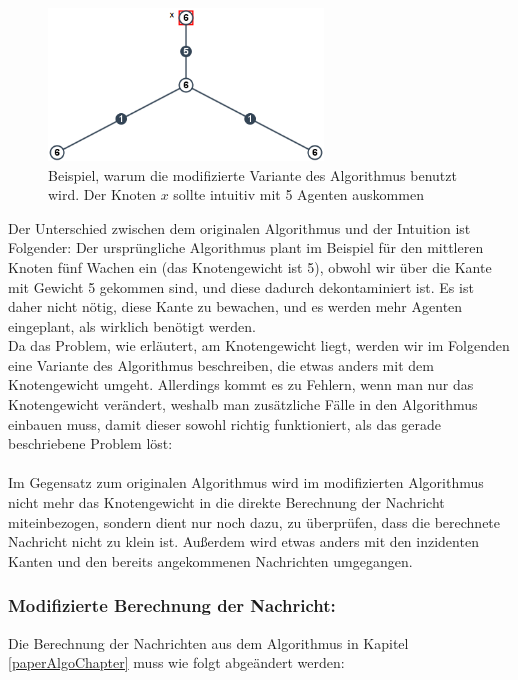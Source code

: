 		\begin{figure}[htb]
			\includegraphics[width=0.65\textwidth]{bilder/abb_paper_problem.png}
			\captionsetup{width=0.65\textwidth}
			\caption{Beispiel, warum die modifizierte Variante des Algorithmus benutzt wird. Der Knoten $x$ sollte intuitiv mit 5 Agenten auskommen}
			\label{fig:negBeispielPaperAlgo}
		\end{figure}

Der Unterschied zwischen dem originalen Algorithmus und der Intuition ist Folgender: Der ursprüngliche Algorithmus plant im Beispiel für den mittleren Knoten fünf Wachen ein (das Knotengewicht ist 5), obwohl wir über die Kante mit Gewicht 5 gekommen sind, und diese dadurch dekontaminiert ist. Es ist daher nicht nötig, diese Kante zu bewachen, und es werden mehr Agenten eingeplant, als wirklich benötigt werden.
\\
Da das Problem, wie erläutert, am Knotengewicht liegt, werden wir im Folgenden eine Variante des Algorithmus beschreiben, die etwas anders mit dem Knotengewicht umgeht. Allerdings kommt es zu Fehlern, wenn man nur das Knotengewicht verändert, weshalb man zusätzliche Fälle in den Algorithmus einbauen muss, damit dieser sowohl richtig funktioniert, als das gerade beschriebene Problem löst:
\\
\\
Im Gegensatz zum originalen Algorithmus wird im modifizierten Algorithmus nicht mehr das Knotengewicht in die direkte Berechnung der Nachricht miteinbezogen, sondern dient nur noch dazu, zu überprüfen, dass die berechnete Nachricht nicht zu klein ist. Außerdem wird etwas anders mit den inzidenten Kanten und den bereits angekommenen Nachrichten umgegangen.

\subsubsection{Modifizierte Berechnung der Nachricht:}

Die Berechnung der Nachrichten aus dem Algorithmus in Kapitel \ref{paperAlgoChapter} muss wie folgt abgeändert werden:

